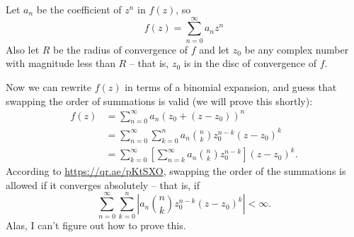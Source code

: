 \documentclass[12pt]{article}
\begin{document}
Let $a_n$ be the coefficient of $z^n$ in $f(z)$, so
\[ f(z) = \sum_{n=0}^\infty a_nz^n \]
Also let $R$ be the radius of convergence of $f$ and let $z_0$ be any complex number with magnitude less than $R$ -- that is, $z_0$ is in the disc of convergence of $f$.
\par
Now we can rewrite $f(z)$ in terms of a binomial expansion, and guess that swapping the order of summations is valid (we will prove this shortly):
\begin{align*}
    f(z) &= \sum_{n=0}^\infty a_n(z_0+(z-z_0))^n \\
         &= \sum_{n=0}^\infty \sum_{k=0}^n a_n \binom{n}{k} z_0^{n-k} (z-z_0)^k \\
         &= \sum_{k=0}^\infty \left[ \sum_{n=k}^\infty a_n \binom{n}{k} z_0^{n-k} \right] (z-z_0)^k.
\end{align*}
According to \url{https://qr.ae/pKtSXO}, swapping the order of the summations is allowed if it converges absolutely -- that is, if
\[ \sum_{n=0}^\infty \sum_{k=0}^n \left| a_n \binom{n}{k} z_0^{n-k} (z-z_0)^k \right| < \infty. \]
Alas, I can't figure out how to prove this.
\end{document}

